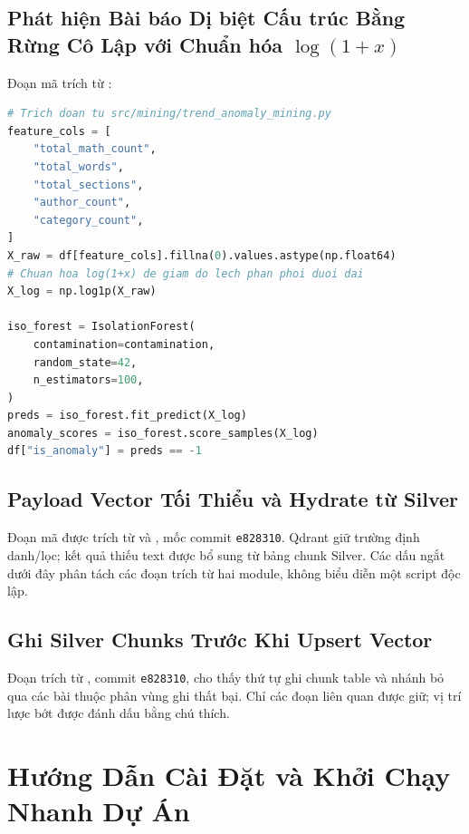 \subsection{Phát hiện Bài báo Dị biệt Cấu trúc Bằng Rừng Cô Lập với Chuẩn hóa $\log(1+x)$}
Đoạn mã trích từ :

\begin{lstlisting}[language=Python, caption={Isolation Forest tren dac trung log1p}]
# Trich doan tu src/mining/trend_anomaly_mining.py
feature_cols = [
    "total_math_count",
    "total_words",
    "total_sections",
    "author_count",
    "category_count",
]
X_raw = df[feature_cols].fillna(0).values.astype(np.float64)
# Chuan hoa log(1+x) de giam do lech phan phoi duoi dai
X_log = np.log1p(X_raw)

iso_forest = IsolationForest(
    contamination=contamination,
    random_state=42,
    n_estimators=100,
)
preds = iso_forest.fit_predict(X_log)
anomaly_scores = iso_forest.score_samples(X_log)
df["is_anomaly"] = preds == -1
\end{lstlisting}


\subsection{Payload Vector Tối Thiểu và Hydrate từ Silver}
Đoạn mã được trích từ  và , mốc commit \texttt{e828310}. Qdrant giữ trường định danh/lọc; kết quả thiếu text được bổ sung từ bảng chunk Silver. Các dấu ngắt dưới đây phân tách các đoạn trích từ hai module, không biểu diễn một script độc lập.


\subsection{Ghi Silver Chunks Trước Khi Upsert Vector}
Đoạn trích từ , commit \texttt{e828310}, cho thấy thứ tự ghi chunk table và nhánh bỏ qua các bài thuộc phân vùng ghi thất bại. Chỉ các đoạn liên quan được giữ; vị trí lược bớt được đánh dấu bằng chú thích.


\section{Hướng Dẫn Cài Đặt và Khởi Chạy Nhanh Dự Án}

